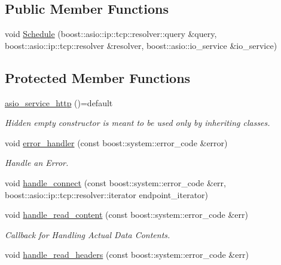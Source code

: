 \subsection*{Public Member Functions}
\begin{DoxyCompactItemize}
\item 
void \hyperlink{classrapp_1_1services_1_1asio__service__http_ad95e973eef8650c5bbc8b90a95feac76}{Schedule} (boost\-::asio\-::ip\-::tcp\-::resolver\-::query \&query, boost\-::asio\-::ip\-::tcp\-::resolver \&resolver, boost\-::asio\-::io\-\_\-service \&io\-\_\-service)
\end{DoxyCompactItemize}
\subsection*{Protected Member Functions}
\begin{DoxyCompactItemize}
\item 
\hyperlink{classrapp_1_1services_1_1asio__service__http_a3ee5112e8a2d1f93e1a29e1ae97e0945}{asio\-\_\-service\-\_\-http} ()=default
\begin{DoxyCompactList}\small\item\em Hidden empty constructor is meant to be used only by inheriting classes. \end{DoxyCompactList}\item 
void \hyperlink{classrapp_1_1services_1_1asio__service__http_a3a8aeeda896612a34fbf519b5688aaa7}{error\-\_\-handler} (const boost\-::system\-::error\-\_\-code \&error)
\begin{DoxyCompactList}\small\item\em Handle an Error. \end{DoxyCompactList}\item 
void \hyperlink{classrapp_1_1services_1_1asio__service__http_a3a168f20797b06f722ebed12ad526e9b}{handle\-\_\-connect} (const boost\-::system\-::error\-\_\-code \&err, boost\-::asio\-::ip\-::tcp\-::resolver\-::iterator endpoint\-\_\-iterator)
\item 
void \hyperlink{classrapp_1_1services_1_1asio__service__http_ad8cdddec917928c476ce1f05205b6254}{handle\-\_\-read\-\_\-content} (const boost\-::system\-::error\-\_\-code \&err)
\begin{DoxyCompactList}\small\item\em Callback for Handling Actual Data Contents. \end{DoxyCompactList}\item 
void \hyperlink{classrapp_1_1services_1_1asio__service__http_a868568846ed87d1b551ce3e489e83754}{handle\-\_\-read\-\_\-headers} (const boost\-::system\-::error\-\_\-code \&err)

\end{DoxyCompactItemize}
